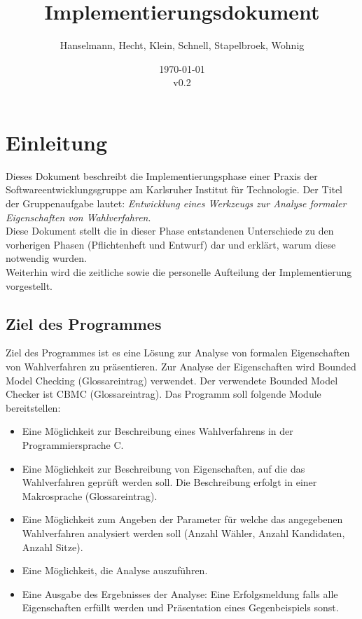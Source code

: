 \documentclass[a4paper]{scrreprt}
\begin{document}
\title{Implementierungsdokument}
\author{Hanselmann, Hecht, Klein, Schnell, Stapelbroek, Wohnig}
\date{\today\\v0.2}
\maketitle 
\tableofcontents	
\listoffigures


\chapter{Einleitung}
Dieses Dokument beschreibt die Implementierungsphase einer Praxis der Softwareentwicklungsgruppe am Karlsruher Institut für Technologie. Der Titel der Gruppenaufgabe lautet: \textit{Entwicklung eines Werkzeugs zur Analyse formaler Eigenschaften von Wahlverfahren}. \\
Diese Dokument stellt die in dieser Phase entstandenen Unterschiede zu den vorherigen Phasen (Pflichtenheft und Entwurf) dar und erklärt, warum diese notwendig wurden. \\
Weiterhin wird die zeitliche sowie die personelle Aufteilung der Implementierung vorgestellt. \\
\section{Ziel des Programmes}
Ziel des Programmes ist es eine Lösung zur Analyse von formalen Eigenschaften von Wahlverfahren zu präsentieren. Zur Analyse der Eigenschaften wird Bounded Model Checking (Glossareintrag) verwendet. Der verwendete Bounded Model Checker ist CBMC (Glossareintrag). Das Programm soll folgende Module  bereitstellen: 
\begin{itemize}
\item Eine Möglichkeit zur Beschreibung eines Wahlverfahrens in der Programmiersprache C. 
\item Eine Möglichkeit zur Beschreibung von Eigenschaften, auf die das Wahlverfahren geprüft werden soll. Die Beschreibung erfolgt in einer Makrosprache (Glossareintrag).
\item Eine Möglichkeit zum Angeben der Parameter für welche das angegebenen Wahlverfahren analysiert werden soll (Anzahl Wähler, Anzahl Kandidaten, Anzahl Sitze). 
\item Eine Möglichkeit, die Analyse auszuführen.
\item Eine Ausgabe des Ergebnisses der Analyse: Eine Erfolgsmeldung falls alle Eigenschaften erfüllt werden und Präsentation eines Gegenbeispiels sonst.
\end{itemize}
\end{document}

